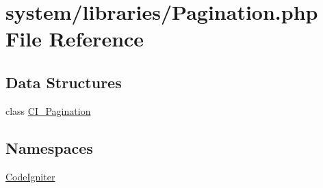 \hypertarget{_pagination_8php}{\section{system/libraries/\-Pagination.php File Reference}
\label{_pagination_8php}
}
\subsection*{Data Structures}
\begin{DoxyCompactItemize}
\item 
class \hyperlink{class_c_i___pagination}{C\-I\-\_\-\-Pagination}
\end{DoxyCompactItemize}
\subsection*{Namespaces}
\begin{DoxyCompactItemize}
\item 
\hyperlink{namespace_code_igniter}{Code\-Igniter}
\end{DoxyCompactItemize}
